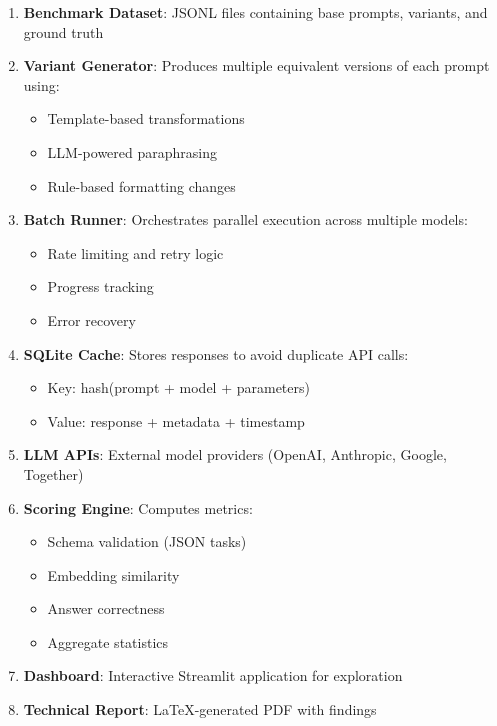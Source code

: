 \documentclass[11pt,a4paper]{article}
\begin{document}
\begin{enumerate}[leftmargin=*]
    \item \textbf{Benchmark Dataset}: JSONL files containing base prompts, variants, and ground truth
    
    \item \textbf{Variant Generator}: Produces multiple equivalent versions of each prompt using:
    \begin{itemize}
        \item Template-based transformations
        \item LLM-powered paraphrasing
        \item Rule-based formatting changes
    \end{itemize}
    
    \item \textbf{Batch Runner}: Orchestrates parallel execution across multiple models:
    \begin{itemize}
        \item Rate limiting and retry logic
        \item Progress tracking
        \item Error recovery
    \end{itemize}
    
    \item \textbf{SQLite Cache}: Stores responses to avoid duplicate API calls:
    \begin{itemize}
        \item Key: hash(prompt + model + parameters)
        \item Value: response + metadata + timestamp
    \end{itemize}
    
    \item \textbf{LLM APIs}: External model providers (OpenAI, Anthropic, Google, Together)
    
    \item \textbf{Scoring Engine}: Computes metrics:
    \begin{itemize}
        \item Schema validation (JSON tasks)
        \item Embedding similarity
        \item Answer correctness
        \item Aggregate statistics
    \end{itemize}
    
    \item \textbf{Dashboard}: Interactive Streamlit application for exploration
    
    \item \textbf{Technical Report}: LaTeX-generated PDF with findings
\end{enumerate}
\end{document}
